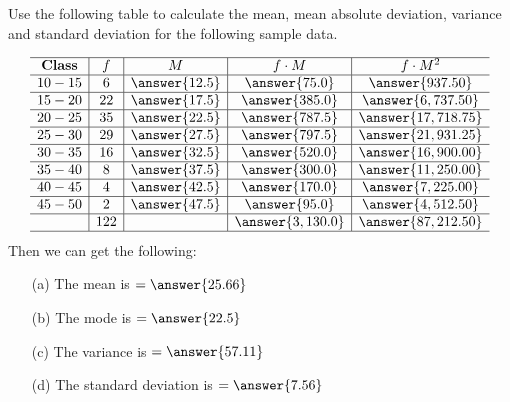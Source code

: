 \documentclass{ximera}
\begin{document}
\begin{question}
Use the following table to calculate the mean, mean absolute deviation, variance and standard deviation for the following sample data.

\[
\begin{array}{c|c|c|c|c} \hline
\textbf{Class}  & \textbf{$f$}  & \textbf{$M$} & \textbf{$f\cdot M$} & \textbf{$f\cdot M^2$} \\ \hline
10-15 & 6   & \answer{12.5} & \answer{75.0}    & \answer{937.50}     \\ \hline
15-20 & 22  & \answer{17.5} & \answer{385.0}   & \answer{6,737.50}   \\ \hline
20-25 & 35  & \answer{22.5} & \answer{787.5}   & \answer{17,718.75}  \\ \hline
25-30 & 29  & \answer{27.5} & \answer{797.5}   & \answer{21,931.25}  \\ \hline
30-35 & 16  & \answer{32.5} & \answer{520.0}   & \answer{16,900.00}  \\ \hline
35-40 & 8   & \answer{37.5} & \answer{300.0}   & \answer{11,250.00}  \\ \hline
40-45 & 4   & \answer{42.5} & \answer{170.0}   & \answer{7,225.00}   \\ \hline
45-50 & 2   & \answer{47.5} & \answer{95.0}    & \answer{4,512.50}   \\ \hline
      & 122 &               & \answer{3,130.0} & \answer{87,212.50}  \\  \hline
\end{array}
\]
Then we can get the following:
\begin{enumerate}
\item[(a)] The mean is $=\answer{25.66}$
\item[(b)] The mode is $=\answer{22.5}$
\item[(c)] The variance is $=\answer{57.11}$
\item[(d)] The standard deviation is $=\answer{7.56}$
\end{enumerate}
\end{question}

\begin{question}


\end{question}

\begin{question}


\end{question}

\begin{question}


\end{question}
\end{document}
